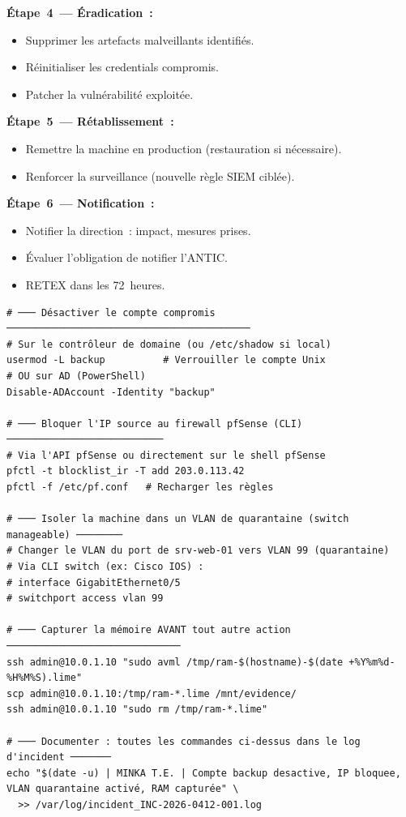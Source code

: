 \begin{boxplaybook}
\textbf{Étape~4~--- Éradication~:}
\begin{itemize}
  \item Supprimer les artefacts malveillants identifiés.
  \item Réinitialiser les credentials compromis.
  \item Patcher la vulnérabilité exploitée.
\end{itemize}

\textbf{Étape~5~--- Rétablissement~:}
\begin{itemize}
  \item Remettre la machine en production (restauration si nécessaire).
  \item Renforcer la surveillance (nouvelle règle SIEM ciblée).
\end{itemize}

\textbf{Étape~6~--- Notification~:}
\begin{itemize}
  \item Notifier la direction~: impact, mesures prises.
  \item Évaluer l'obligation de notifier l'ANTIC.
  \item RETEX dans les 72~heures.
\end{itemize}
\end{boxplaybook}

\begin{lstlisting}[style=StyleTerminal,
  caption={Runbook --- confinement SSH compromis (Linux)},
  label={lst:runbook-ssh}]
# ─── Désactiver le compte compromis ──────────────────────────────────────────
# Sur le contrôleur de domaine (ou /etc/shadow si local)
usermod -L backup          # Verrouiller le compte Unix
# OU sur AD (PowerShell)
Disable-ADAccount -Identity "backup"

# ─── Bloquer l'IP source au firewall pfSense (CLI) ───────────────────────────
# Via l'API pfSense ou directement sur le shell pfSense
pfctl -t blocklist_ir -T add 203.0.113.42
pfctl -f /etc/pf.conf   # Recharger les règles

# ─── Isoler la machine dans un VLAN de quarantaine (switch manageable) ────────
# Changer le VLAN du port de srv-web-01 vers VLAN 99 (quarantaine)
# Via CLI switch (ex: Cisco IOS) :
# interface GigabitEthernet0/5
# switchport access vlan 99

# ─── Capturer la mémoire AVANT tout autre action ──────────────────────────────
ssh admin@10.0.1.10 "sudo avml /tmp/ram-$(hostname)-$(date +%Y%m%d-%H%M%S).lime"
scp admin@10.0.1.10:/tmp/ram-*.lime /mnt/evidence/
ssh admin@10.0.1.10 "sudo rm /tmp/ram-*.lime"

# ─── Documenter : toutes les commandes ci-dessus dans le log d'incident ───────
echo "$(date -u) | MINKA T.E. | Compte backup desactive, IP bloquee, VLAN quarantaine activé, RAM capturée" \
  >> /var/log/incident_INC-2026-0412-001.log
\end{lstlisting}

